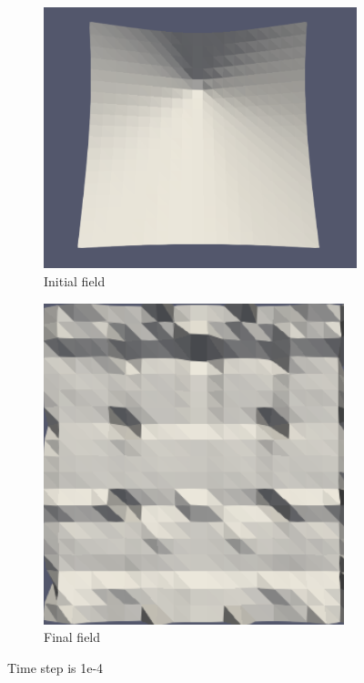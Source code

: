 \documentclass{article}
\begin{document}
\begin{figure}[hbt!]
  \begin{subfigure}{0.5\textwidth}
        \centering
        \includegraphics[width=\textwidth]{Figures/e-4 20x20/for n 1.png}
        \caption{Initial field}
  \end{subfigure}
  \hfill
  \begin{subfigure}{0.4\textwidth}
        \centering
        \includegraphics[width=\textwidth]{Figures/e-4 20x20/for n 10.png}
        \caption{Final field}
  \end{subfigure}
  \caption{Time step is 1e-4}
  \label{t1m1_1} 
\end{figure}
\end{document}

